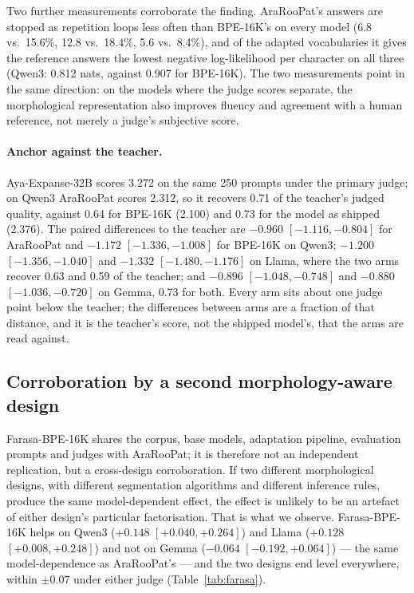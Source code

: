 \documentclass[a4paper,fleqn]{cas-sc}
\begin{document}
Two further measurements corroborate the finding. AraRooPat's answers are stopped as repetition loops less often than BPE-16K's on every model (6.8 vs.\ 15.6\%, 12.8 vs.\ 18.4\%, 5.6 vs.\ 8.4\%), and of the adapted vocabularies it gives the reference answers the lowest negative log-likelihood per character on all three (Qwen3: 0.812 nats, against 0.907 for BPE-16K). The two measurements point in the same direction: on the models where the judge scores separate, the morphological representation also improves fluency and agreement with a human reference, not merely a judge's subjective score.

\paragraph{Anchor against the teacher.}
Aya-Expanse-32B scores 3.272 on the same 250 prompts under the primary judge; on Qwen3 AraRooPat scores 2.312, so it recovers 0.71 of the teacher's judged quality, against 0.64 for BPE-16K (2.100) and 0.73 for the model as shipped (2.376). The paired differences to the teacher are $-0.960$ $[-1.116,-0.804]$ for AraRooPat and $-1.172$ $[-1.336,-1.008]$ for BPE-16K on Qwen3; $-1.200$ $[-1.356,-1.040]$ and $-1.332$ $[-1.480,-1.176]$ on Llama, where the two arms recover 0.63 and 0.59 of the teacher; and $-0.896$ $[-1.048,-0.748]$ and $-0.880$ $[-1.036,-0.720]$ on Gemma, 0.73 for both. Every arm sits about one judge point below the teacher; the differences between arms are a fraction of that distance, and it is the teacher's score, not the shipped model's, that the arms are read against.

\subsection{Corroboration by a second morphology-aware design}
\label{sec:results:corroboration}

Farasa-BPE-16K shares the corpus, base models, adaptation pipeline, evaluation prompts and judges with AraRooPat; it is therefore not an independent replication, but a cross-design corroboration. If two different morphological designs, with different segmentation algorithms and different inference rules, produce the same model-dependent effect, the effect is unlikely to be an artefact of either design's particular factorisation. That is what we observe. Farasa-BPE-16K helps on Qwen3 ($+0.148$ $[+0.040,+0.264]$) and Llama ($+0.128$ $[+0.008,+0.248]$) and not on Gemma ($-0.064$ $[-0.192,+0.064]$) --- the same model-dependence as AraRooPat's --- and the two designs end level everywhere, within $\pm 0.07$ under either judge (Table~\ref{tab:farasa}).
\end{document}
